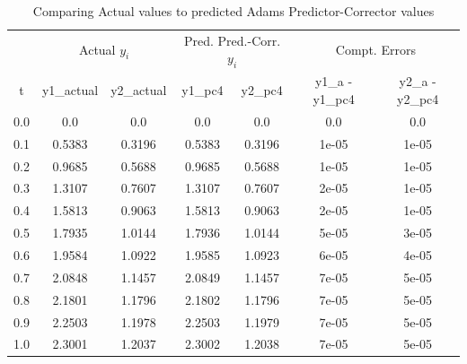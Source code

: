 \documentclass[12pt,oneside]{book}
\begin{document}
		\begin{table}[h!]
			\caption{Comparing Actual values to predicted Adams Predictor-Corrector values}
			\begin{tabular}{ccccccc}
				\toprule
				& \multicolumn{2}{c}{Actual $ y_{i} $} & \multicolumn{2}{c}{Pred. Pred.-Corr. $ y_{i} $ } & \multicolumn{2}{c}{Compt. Errors} \\
				t&y1\_actual&y2\_actual&y1\_pc4&y2\_pc4&y1\_a - y1\_pc4&y2\_a - y2\_pc4 \\ \midrule
				0.0&0.0&0.0&0.0&0.0&0.0&0.0 \\
				0.1&0.5383&0.3196&0.5383&0.3196&1e-05&1e-05 \\
				0.2&0.9685&0.5688&0.9685&0.5688&1e-05&1e-05 \\
				0.3&1.3107&0.7607&1.3107&0.7607&2e-05&1e-05 \\
				0.4&1.5813&0.9063&1.5813&0.9063&2e-05&1e-05 \\
				0.5&1.7935&1.0144&1.7936&1.0144&5e-05&3e-05 \\
				0.6&1.9584&1.0922&1.9585&1.0923&6e-05&4e-05 \\
				0.7&2.0848&1.1457&2.0849&1.1457&7e-05&5e-05 \\
				0.8&2.1801&1.1796&2.1802&1.1796&7e-05&5e-05 \\
				0.9&2.2503&1.1978&2.2503&1.1979&7e-05&5e-05 \\
				1.0&2.3001&1.2037&2.3002&1.2038&7e-05&5e-05 \\
				\bottomrule
			\end{tabular}
		\end{table}
	
\clearpage
\end{document}
